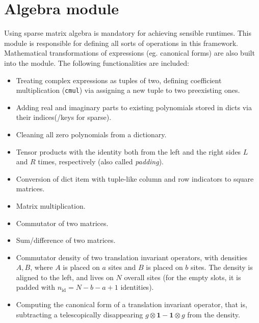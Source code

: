 \documentclass[a4paper, 11pt, twoside, onecolumn]{article}
\begin{document}
\section{Algebra module}
Using sparse matrix algebra is mandatory for achieving sensible runtimes. This module is responsible for defining all sorts of operations in this framework. Mathematical transformations of expressions (eg. canonical forms) are also built into the module. The following functionalities are included:
\begin{itemize}
    \item Treating complex expressions as tuples of two, defining coefficient multiplication (\texttt{cmul}) via assigning a new tuple to two preexisting ones.
    \item Adding real and imaginary parts to existing polynomials stored in dicts via their indices(/keys for sparse). 
    \item Cleaning all zero polynomials from a dictionary.
    \item Tensor products with the identity both from the left and the right sides $L$ and $R$ times, respectively (also called \textit{padding}).
    \item Conversion of dict item with tuple-like column and row indicators to square matrices.
    \item Matrix multiplication.
    \item Commutator of two matrices.
    \item Sum/difference of two matrices.
    \item Commutator density of two translation invariant operators, with densities $A,B$, where $A$ is placed on $a$ sites and $B$ is placed on $b$ sites. The density is aligned to the left, and lives on $N$ overall sites (for the empty slots, it is padded with $n_{\mathrm{id}}=N-b-a+1$ identities).
    \item Computing the canonical form of a translation invariant operator, that is, subtracting a telescopically disappearing $g\otimes\mathbf{1}-\mathbf{1}\otimes g$ from the density.
\end{itemize}
\end{document}
